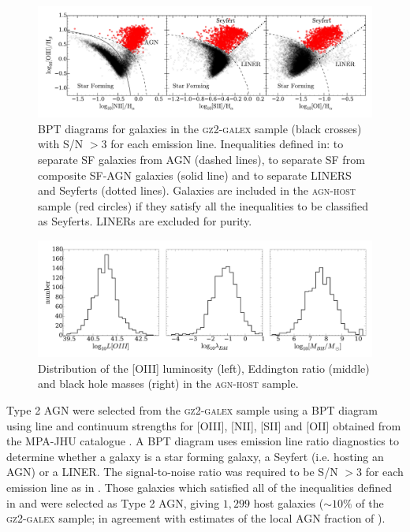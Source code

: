 \begin{figure}
\includegraphics[width=\textwidth]{agn/fig2.pdf}
\caption[BPT diagram used to select AGN host galaxies]{BPT diagrams for galaxies in the \textsc{gz2-galex} sample (black crosses) with S/N $> 3$ for each emission line. Inequalities defined in: \protect\cite{kewley01} to separate SF galaxies from AGN (dashed lines), \protect\cite{kauffmann03b} to separate SF from composite SF-AGN galaxies (solid line) and \protect\cite{kewley06} to separate LINERS and Seyferts (dotted lines). Galaxies are included in the \textsc{agn-host} sample (red circles) if they satisfy all the inequalities to be classified as Seyferts. LINERs are excluded for purity.}
\label{bpt}
\end{figure}

\begin{figure}
\includegraphics[width=\textwidth]{agn/agn-host_distributions_loiii_edd_ratio_mbh.pdf}
\caption[Distribution of measured galaxy parameters in the \textsc{agn-host} sample]{Distribution of the [OIII] luminosity (left), Eddington ratio (middle) and black hole masses (right) in the \textsc{agn-host} sample.}
\label{fig:agndistributions}
\end{figure}


Type 2 AGN were selected from the \textsc{gz2-galex} sample using a BPT diagram \citep{bpt} using line and continuum strengths for [OIII], [NII], [SII] and [OII] obtained from the MPA-JHU catalogue \citep{kauffmann03, brinchmann04}. A BPT diagram uses emission line ratio diagnostics to determine whether a galaxy is a star forming galaxy, a Seyfert (i.e. hosting an AGN) or a LINER. The signal-to-noise ratio was required to be S/N $> 3$ for each emission line as in \cite{schawinski10a}. Those galaxies which satisfied all of the inequalities defined in \citet[][to separate SF galaxies from AGN]{kewley01} and \citet[][to separate SF galaxies from composite SF-AGN galaxies]{kauffmann03b} were selected as Type 2 AGN, giving $1,299$ host galaxies ($\sim10\%$ of the \textsc{gz2-galex} sample; in agreement with estimates of the local AGN fraction of \citealt{kauffmann04, pimbblet13}).


